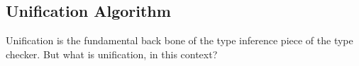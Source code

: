 \documentclass{l4proj}
\begin{document}


    
    
    


\subsection{Unification Algorithm}

Unification is the fundamental back bone of the type inference piece of the type checker.
But what is unification, in this context?
\end{document}
